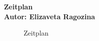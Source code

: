 \documentclass[a4paper,10pt]{article}
\begin{document}
\vspace*{1cm}

{\bfseries \large Zeitplan \\[1mm]
\normalfont Autor: Elizaveta Ragozina}					%


	\begin{figure}[ht]
	    \caption{Zeitplan}
		\label{fig1}
	\end{figure}
\end{document}
